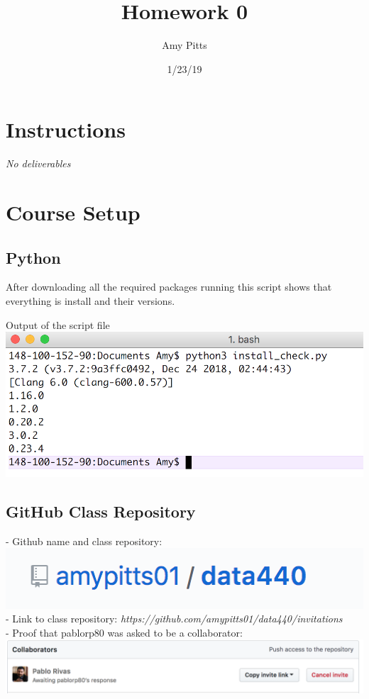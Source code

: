 \documentclass[a4paper]{article}
\title{Homework 0}
\author{Amy Pitts}
\date{1/23/19}
\begin{document}
\lstset{language=Python}

\maketitle

\section{Instructions}
\textit{No deliverables}

\section{Course Setup}

\subsection{Python}
After downloading all the required packages running
this script shows that everything is install and 
their versions. 

Output of the script file  \\
\includegraphics{python_downloads}

\subsection{GitHub Class Repository}

- Github name and class repository: \\
\includegraphics{github_name}\\
\bigskip
- Link to class repository: \textit{https://github.com/amypitts01/data440/invitations} \\
\bigskip
- Proof that pablorp80 was asked to be a collaborator: \\
\includegraphics[width=1\textwidth]{proof_of_collab}
\end{document}
